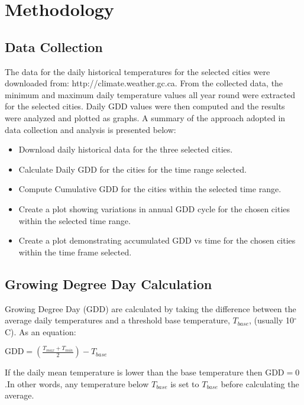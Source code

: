 \documentclass{article}
\begin{document}
\section{ \bf Methodology}
\subsection{Data Collection}
The data for the daily historical temperatures for the selected cities were downloaded from: http://climate.weather.gc.ca. From the collected data, the minimum and maximum daily temperature values all year round were extracted for the selected cities. Daily GDD values were then computed and the results were analyzed and plotted as graphs. A summary of the approach adopted in data collection and analysis is presented below:

\begin{itemize}
\item Download daily historical data for the three selected cities. 
\item Calculate Daily GDD for the cities for the time range selected. 
\item Compute Cumulative GDD for the cities within the selected time range.
\item Create a plot showing variations in annual GDD cycle for the chosen cities within the selected time range. 
\item Create a plot demonstrating accumulated GDD vs time for the chosen cities within the time frame selected. 
\end{itemize}

\subsection{Growing Degree Day Calculation}
Growing Degree Day (GDD) are calculated by taking the difference between the average daily temperatures and a threshold base temperature, $T_{base}$, (usually 10$^{\circ}$C). As an equation: \vspace{5mm}

{\centering
$\textrm{GDD} = \left(\frac{T_{max} + T_{min}}{2}\right) - T_{base}$\\ [\baselineskip]
}

\noindent If the daily mean temperature is lower than the base temperature then $\textrm{GDD} = 0$.In other words, any temperature below $T_{base}$ is set to $T_{base}$ before calculating the average.\vspace{5mm}
\end{document}
